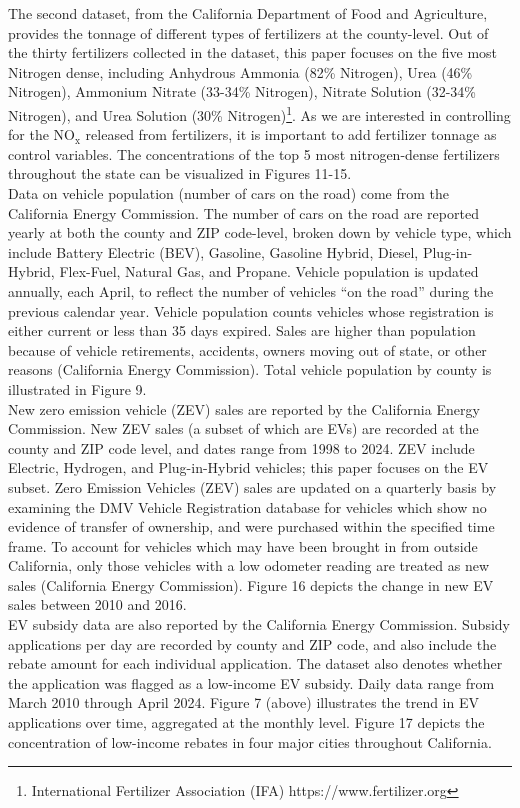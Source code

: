 \documentclass[12pt]{article}
\newcommand\tab[1][.50cm]{\hspace*{#1}}
\begin{document}
\begin{multicols}{2}
		\tab The second dataset, from the California Department of Food and Agriculture, provides the tonnage of different types of fertilizers at the county-level. Out of the thirty fertilizers collected in the dataset, this paper focuses on the five most Nitrogen dense, including Anhydrous Ammonia (82\% Nitrogen), Urea (46\% Nitrogen), Ammonium Nitrate (33-34\% Nitrogen), Nitrate Solution (32-34\% Nitrogen), and Urea Solution (30\% Nitrogen)\footnote{International Fertilizer Association (IFA) https://www.fertilizer.org}. As we are interested in controlling for the $\text{NO}_\text{x}$ released from fertilizers, it is important to add fertilizer tonnage as control variables. The concentrations of the top 5 most nitrogen-dense fertilizers throughout the state can be visualized in Figures 11-15. \\
		\tab Data on vehicle population (number of cars on the road) come from the California Energy Commission. The number of cars on the road are reported yearly at both the county and ZIP code-level, broken down by vehicle type, which include Battery Electric (BEV), Gasoline, Gasoline Hybrid, Diesel, Plug-in-Hybrid, Flex-Fuel, Natural Gas, and Propane. Vehicle population is updated annually, each April, to reflect the number of vehicles “on the road” during the previous calendar year. Vehicle population counts vehicles whose registration is either current or less than 35 days expired. Sales are higher than population because of vehicle retirements, accidents, owners moving out of state, or other reasons (California Energy Commission). Total vehicle population by county is illustrated in Figure 9.\\
		\tab New zero emission vehicle (ZEV) sales are reported by the California Energy Commission. New ZEV sales (a subset of which are EVs) are recorded at the county and ZIP code level, and dates range from 1998 to 2024. ZEV include Electric, Hydrogen, and Plug-in-Hybrid vehicles; this paper focuses on the EV subset. Zero Emission Vehicles (ZEV) sales are updated on a quarterly basis by examining the DMV Vehicle Registration database for vehicles which show no evidence of transfer of ownership, and were purchased within the specified time frame. To account for vehicles which may have been brought in from outside California, only those vehicles with a low odometer reading are treated as new sales (California Energy Commission). Figure 16 depicts the change in new EV sales between 2010 and 2016. \\
		\tab EV subsidy data are also reported by the California Energy Commission. Subsidy applications per day are recorded by county and ZIP code, and also include the rebate amount for each individual application. The dataset also denotes whether the application was flagged as a low-income EV subsidy. Daily data range from March 2010 through April 2024. Figure 7 (above) illustrates the trend in EV applications over time, aggregated at the monthly level. Figure 17 depicts the concentration of low-income rebates in four major cities throughout California.  \\

\end{multicols}
\end{document}
